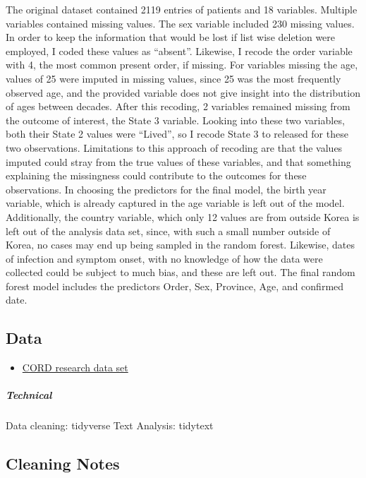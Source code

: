\documentclass[
]{article}
\providecommand{\tightlist}{%
  \setlength{\itemsep}{0pt}\setlength{\parskip}{0pt}}
\begin{document}
The original dataset contained 2119 entries of patients and 18
variables. Multiple variables contained missing values. The sex variable
included 230 missing values. In order to keep the information that would
be lost if list wise deletion were employed, I coded these values as
``absent''. Likewise, I recode the order variable with 4, the most
common present order, if missing. For variables missing the age, values
of 25 were imputed in missing values, since 25 was the most frequently
observed age, and the provided variable does not give insight into the
distribution of ages between decades. After this recoding, 2 variables
remained missing from the outcome of interest, the State 3 variable.
Looking into these two variables, both their State 2 values were
``Lived'', so I recode State 3 to released for these two observations.
Limitations to this approach of recoding are that the values imputed
could stray from the true values of these variables, and that something
explaining the missingness could contribute to the outcomes for these
observations. In choosing the predictors for the final model, the birth
year variable, which is already captured in the age variable is left out
of the model. Additionally, the country variable, which only 12 values
are from outside Korea is left out of the analysis data set, since, with
such a small number outside of Korea, no cases may end up being sampled
in the random forest. Likewise, dates of infection and symptom onset,
with no knowledge of how the data were collected could be subject to
much bias, and these are left out. The final random forest model
includes the predictors Order, Sex, Province, Age, and confirmed date.

\hypertarget{data}{%
\subsection{Data}\label{data}}

\begin{itemize}
\tightlist
\item
  \href{https://www.kaggle.com/allen-institute-for-ai/CORD-19-research-challenge}{CORD
  research data set}
\end{itemize}

\hypertarget{technical}{%
\subparagraph{Technical}\label{technical}}

Data cleaning: tidyverse Text Analysis: tidytext

\hypertarget{cleaning-notes}{%
\subsection{Cleaning Notes}\label{cleaning-notes}}
\end{document}
